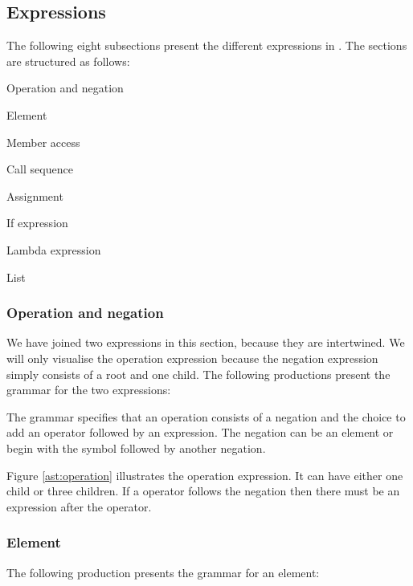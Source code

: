 \subsection{Expressions}
The following eight subsections present the different expressions in \productname{}. The sections are structured as follows:

\begin{dlist}
\item Operation and negation
\item Element
\item Member access
\item Call sequence
\item Assignment
\item If expression
\item Lambda expression
\item List
\end{dlist}

\subsubsection{Operation and negation}
We have joined two expressions in this section, because they are intertwined. We will only visualise the operation expression because the negation expression simply consists of a root and one child. The following productions present the grammar for the two expressions:

\begin{ebnf}%
\end{ebnf}%

The grammar specifies that an operation consists of a negation and the choice to add an operator followed by an expression. The negation can be an element or begin with the \gter{-} symbol followed by another negation.



Figure \ref{ast:operation} illustrates the operation expression. It can have either one child or three children. If a operator follows the negation then there must be an expression after the operator.

\subsubsection{Element}

The following production presents the grammar for an element:

